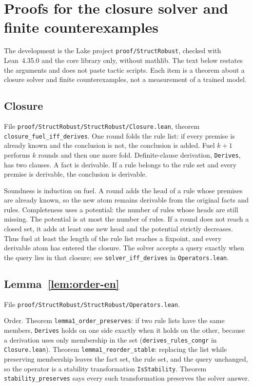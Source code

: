 \documentclass[11pt,a4paper]{article}
\theoremstyle{plain}
\begin{document}
\appendix
\section{Proofs for the closure solver and finite counterexamples}
\label{app:proofs-en}

The development is the Lake project \texttt{proof/StructRobust}, checked with
Lean~4.35.0 and the core library only, without mathlib. The text below
restates the arguments and does not paste tactic scripts. Each item is a
theorem about a closure solver and finite counterexamples, not a measurement
of a trained model.

\subsection{Closure}
\label{app:closure-en}

File \texttt{proof/StructRobust/StructRobust/Closure.lean}, theorem
\texttt{closure\_fuel\_iff\_derives}. One round folds the rule list: if every
premise is already known and the conclusion is not, the conclusion is added.
Fuel $k+1$ performs $k$ rounds and then one more fold. Definite-clause
derivation, \texttt{Derives}, has two clauses. A fact is derivable. If a rule
belongs to the rule set and every premise is derivable, the conclusion is
derivable.

Soundness is induction on fuel. A round adds the head of a rule whose premises
are already known, so the new atom remains derivable from the original facts
and rules. Completeness uses a potential: the number of rules whose heads are
still missing. The potential is at most the number of rules. If a round does
not reach a closed set, it adds at least one new head and the potential
strictly decreases. Thus fuel at least the length of the rule list reaches a
fixpoint, and every derivable atom has entered the closure. The solver accepts
a query exactly when the query lies in that closure; see
\texttt{solver\_iff\_derives} in \texttt{Operators.lean}.

\subsection{Lemma~\ref{lem:order-en}}

File \texttt{proof/StructRobust/StructRobust/Operators.lean}.

Order. Theorem \texttt{lemma1\_order\_preserves}: if two rule lists have the
same members, \texttt{Derives} holds on one side exactly when it holds on the
other, because a derivation uses only membership in the set
(\texttt{derives\_rules\_congr} in \texttt{Closure.lean}). Theorem
\texttt{lemma1\_reorder\_stable}: replacing the list while preserving
membership leaves the fact set, the rule set, and the query unchanged, so the
operator is a stability transformation \texttt{IsStability}. Theorem
\texttt{stability\_preserves} says every such transformation preserves the
solver answer.
\end{document}
